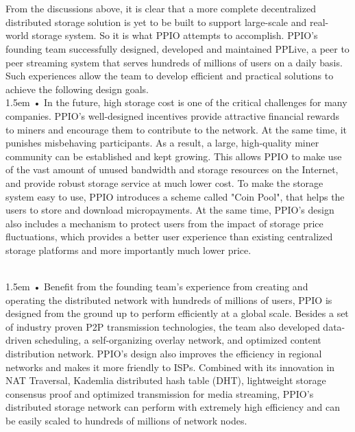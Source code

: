 \documentclass[10pt,a4paper]{article}
\begin{document}
\vspace{-0.5em}
\\ \\From the discussions above, it is clear that a more complete decentralized distributed storage solution is yet to be built to support large-scale and real-world storage system. So it is what PPIO attempts to accomplish. PPIO's founding team successfully designed, developed and maintained PPLive, a peer to peer streaming system that serves hundreds of millions of users on a daily basis. Such experiences allow the team to develop efficient and practical solutions to achieve the following design goals.
\vspace{-0.6em}
 \\ 
 
\hangindent 1.5em
\noindent   
• In the future, high storage cost is one of the critical challenges for many companies. PPIO's well-designed incentives provide attractive financial rewards to miners and encourage them to contribute to the network. At the same time, it punishes misbehaving participants. As a result, a large, high-quality miner community can be established and kept growing. This allows PPIO to make use of the vast amount of unused bandwidth and storage resources on the Internet, and provide robust storage service at much lower cost. To make the storage system easy to use, PPIO introduces a scheme called "Coin Pool", that helps the users to store and download micropayments. At the same time, PPIO's design also includes a mechanism to protect users from the impact of storage price fluctuations, which provides a better user experience than existing centralized storage platforms and more importantly much lower price.
\vspace{-0.6em}
\\ \

\hangindent 1.5em
\noindent   
• Benefit from the founding team's experience from creating and operating the distributed network with hundreds of millions of users, PPIO is designed from the ground up to perform efficiently at a global scale. Besides a set of industry proven P2P transmission technologies, the team also developed data-driven scheduling, a self-organizing overlay network, and optimized content distribution network. PPIO's design also improves the efficiency in regional networks and makes it more friendly to ISPs. Combined with its innovation in NAT Traversal, Kademlia distributed hash table (DHT), lightweight storage consensus proof and optimized transmission for media streaming, PPIO's distributed storage network can perform with extremely high efficiency and can be easily scaled to hundreds of millions of network nodes.
\vspace{-0.6em}
\\ \
\end{document}
